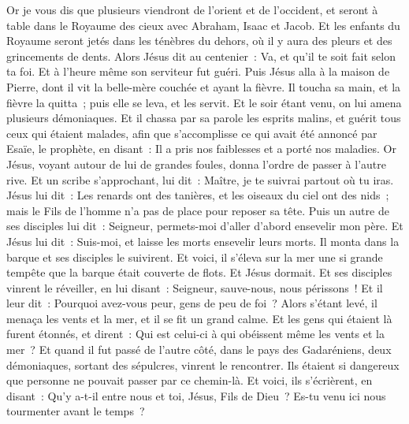 \begin{multicols}{2}
Or je vous dis que plusieurs viendront de l'orient et de l'occident, et seront à table dans le Royaume des cieux avec Abraham, Isaac et Jacob.
Et les enfants du Royaume seront jetés dans les ténèbres du dehors, où il y aura des pleurs et des grincements de dents.
Alors Jésus dit au centenier~: Va, et qu'il te soit fait selon ta foi. Et à l'heure même son serviteur fut guéri.
Puis Jésus alla à la maison de Pierre, dont il vit la belle-mère couchée et ayant la fièvre.
Il toucha sa main, et la fièvre la quitta~; puis elle se leva, et les servit.
Et le soir étant venu, on lui amena plusieurs démoniaques. Et il chassa par sa parole les esprits malins, et guérit tous ceux qui étaient malades,
afin que s'accomplisse ce qui avait été annoncé par Esaïe, le prophète, en disant~: Il a pris nos faiblesses et a porté nos maladies.
Or Jésus, voyant autour de lui de grandes foules, donna l'ordre de passer à l'autre rive.
Et un scribe s'approchant, lui dit~: Maître, je te suivrai partout où tu iras.
Jésus lui dit~: Les renards ont des tanières, et les oiseaux du ciel ont des nids~; mais le Fils de l'homme n'a pas de place pour reposer sa tête.
Puis un autre de ses disciples lui dit~: Seigneur, permets-moi d'aller d'abord ensevelir mon père.
Et Jésus lui dit~: Suis-moi, et laisse les morts ensevelir leurs morts.
Il monta dans la barque et ses disciples le suivirent.
Et voici, il s'éleva sur la mer une si grande tempête que la barque était couverte de flots. Et Jésus dormait.
Et ses disciples vinrent le réveiller, en lui disant~: Seigneur, sauve-nous, nous périssons~!
Et il leur dit~: Pourquoi avez-vous peur, gens de peu de foi~? Alors s'étant levé, il menaça les vents et la mer, et il se fit un grand calme.
Et les gens qui étaient là furent étonnés, et dirent~: Qui est celui-ci à qui obéissent même les vents et la mer~?
Et quand il fut passé de l'autre côté, dans le pays des Gadaréniens, deux démoniaques, sortant des sépulcres, vinrent le rencontrer. Ils étaient si dangereux que personne ne pouvait passer par ce chemin-là.
Et voici, ils s'écrièrent, en disant~: Qu'y a-t-il entre nous et toi, Jésus, Fils de Dieu~? Es-tu venu ici nous tourmenter avant le temps~?

\end{multicols}
